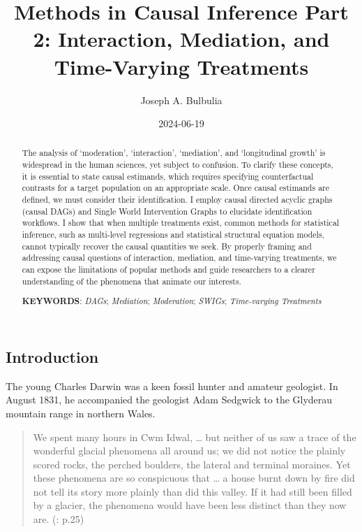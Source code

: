 \documentclass[
  single column]{article}
\title{Methods in Causal Inference Part 2: Interaction, Mediation, and
Time-Varying Treatments}
\author{Joseph A. Bulbulia}
\affil{%
             \small{     Victoria University of Wellington, NEW ZEALAND
          ORCID \textcolor[HTML]{A6CE39}{\aiOrcid} ~0000-0002-5861-2056 }
              }
\date{2024-06-19}
\begin{document}
\maketitle
\begin{abstract}
The analysis of `moderation', `interaction', `mediation', and
`longitudinal growth' is widespread in the human sciences, yet subject
to confusion. To clarify these concepts, it is essential to state causal
estimands, which requires specifying counterfactual contrasts for a
target population on an appropriate scale. Once causal estimands are
defined, we must consider their identification. I employ causal directed
acyclic graphs (causal DAGs) and Single World Intervention Graphs to
elucidate identification workflows. I show that when multiple treatments
exist, common methods for statistical inference, such as multi-level
regressions and statistical structural equation models, cannot typically
recover the causal quantities we seek. By properly framing and
addressing causal questions of interaction, mediation, and time-varying
treatments, we can expose the limitations of popular methods and guide
researchers to a clearer understanding of the phenomena that animate our
interests.

\textbf{KEYWORDS}: \emph{DAGs}; \emph{Mediation}; \emph{Moderation};
\emph{SWIGs}; \emph{Time-varying Treatments}
\end{abstract}

\subsection{Introduction}\label{id-introduction}

The young Charles Darwin was a keen fossil hunter and amateur geologist.
In August 1831, he accompanied the geologist Adam Sedgwick to the
Glyderau mountain range in northern Wales.

\begin{quote}
We spent many hours in Cwm Idwal, \ldots{} but neither of us saw a trace
of the wonderful glacial phenomena all around us; we did not notice the
plainly scored rocks, the perched boulders, the lateral and terminal
moraines. Yet these phenomena are so conspicuous that \ldots{} a house
burnt down by fire did not tell its story more plainly than did this
valley. If it had still been filled by a glacier, the phenomena would
have been less distinct than they now are.
(: p.25)
\end{quote}
\end{document}
